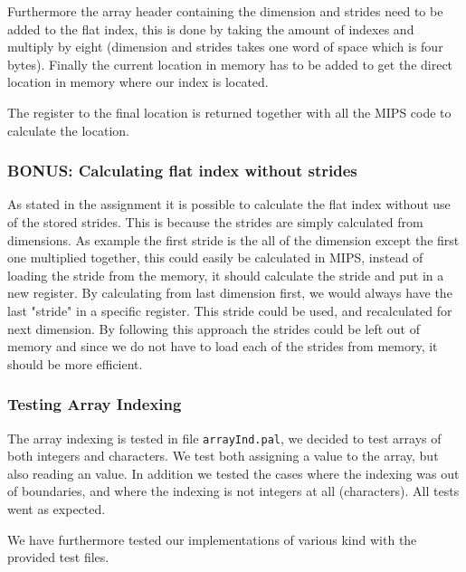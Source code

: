 \documentclass[10pt]{article}
\begin{document}
Furthermore the array header containing the dimension and strides need to be added to the flat index, this is done by taking the amount of indexes and multiply by eight (dimension and strides takes one word of space which is four bytes). Finally the current location in memory has to be added to get the direct location in memory where our index is located.

The register to the final location is returned together with all the MIPS code to calculate the location.

\subsubsection*{BONUS: Calculating flat index without strides}
As stated in the assignment it is possible to calculate the flat index without use of the stored strides. This is because the strides are simply calculated from dimensions. As example the first stride is the all of the dimension except the first one multiplied together, this could easily be calculated in MIPS, instead of loading the stride from the memory, it should calculate the stride and put in a new register. By calculating from last dimension first, we would always have the last "stride" in a specific register. This stride could be used, and recalculated for next dimension. By following this approach the strides could be left out of memory and since we do not have to load each of the strides from memory, it should be more efficient.

\subsubsection{Testing Array Indexing}
The array indexing is tested in file \texttt{arrayInd.pal}, we decided to test arrays of both integers and characters. We test both assigning a value to the array, but also reading an value. In addition we tested the cases where the indexing was out of boundaries, and where the indexing is not integers at all (characters). All tests went as expected.

We have furthermore tested our implementations of various kind with the provided test files.
\end{document}
